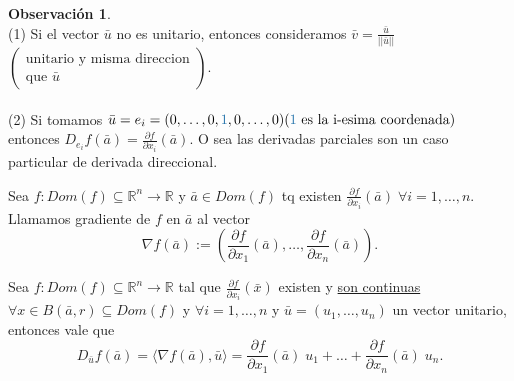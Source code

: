 \documentclass{article}
\theoremstyle{definition}
\theoremstyle{definition}
\newtheorem*{obs}{Observación}
\theoremstyle{remark}
\begin{document}
\begin{obs}
  \;\\
  \textcolor{verdep2}{(1)} Si el vector $\bar{u}$ no es unitario, entonces consideramos $\bar{v}=\frac{\bar{u}}{||\bar{u}||}$ $\left(\begin{array}{c}
      \text{unitario y misma direccion} \\
      \text{que } \bar{u}
  \end{array}\right)$. \\\\
  \textcolor{verdep2}{(2)} Si tomamos $\bar{u}=e_i=(0,\dots,0,\textcolor{azulp2}{1},0,\dots,0) (\textcolor{azulp2}{1} \text{ es la i-esima coordenada})$ entonces $D_{e_i}f(\bar{a})=\frac{\partial f}{\partial x_i}(\bar{a})$. O sea las derivadas parciales son un caso particular de derivada direccional. 
\end{obs}
\begin{defi}
  Sea $f : Dom(f) \subseteq \mathbb{R}^n \to \mathbb{R}$ y $\bar{a} \in Dom(f)$ tq existen $\frac{\partial f}{\partial x_i}(\bar{a}) \; \forall i=1,\dots,n$. Llamamos gradiente de $f$ en $\bar{a}$ al vector \[
    \nabla f(\bar{a}):=\left(\frac{\partial f}{\partial x_1}(\bar{a}), \dots ,\frac{\partial f }{\partial x_n}(\bar{a})\right).
  \]
\end{defi}
\begin{teo}
  Sea $f: Dom(f) \subseteq \mathbb{R}^n \to \mathbb{R}$ tal que $\frac{\partial f}{\partial x_i}(\bar{x})$ existen y \underline{son continuas} $\forall x \in B(\bar{a},r) \subseteq Dom(f)$ y $\forall i =1, \dots, n$ y $\bar{u}=(u_1,\dots,u_n)$ un vector unitario, entonces vale que \[
    D_{\bar{u}}f(\bar{a}) = \big\langle \nabla f(\bar{a}),\bar{u}\big\rangle = \frac{\partial f}{\partial x_1}(\bar{a})\; u_1 + \dots + \frac{\partial f}{\partial x_n}(\bar{a}) \; u_n.
  \]
\end{teo}\pagebreak
\end{document}
